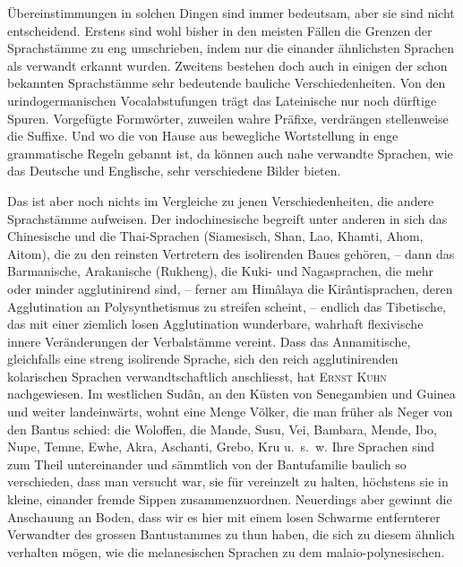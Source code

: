 Übereinstimmungen in solchen Dingen sind immer bedeutsam, aber sie sind nicht entscheidend. Erstens sind wohl bisher in den meisten Fällen die Grenzen der Sprachstämme zu eng umschrieben, indem nur die einander ähnlichsten Sprachen als verwandt erkannt wurden. Zweitens bestehen doch auch in einigen der schon bekannten Sprachstämme sehr bedeutende bauliche Verschiedenheiten. Von den urindogermanischen Vocalabstufungen trägt das Lateinische nur noch dürftige Spuren. Vorgefügte Formwörter, zuweilen wahre Präfixe, verdrängen stellenweise die Suffixe. Und wo die von Hause aus bewegliche Wortstellung in enge grammatische Regeln gebannt ist, da können auch nahe verwandte Sprachen, wie das Deutsche und Englische, sehr verschiedene Bilder bieten.

Das ist aber noch nichts im Vergleiche zu jenen Verschiedenheiten, die andere Sprachstämme aufweisen. Der indochinesische begreift unter anderen in sich das Chinesische und die Thai-Sprachen (Siamesisch, Shan, Lao, Khamti, Ahom, Aitom), die zu den reinsten Vertretern des isolirenden Baues gehören, – dann das Barmanische, Arakanische (Rukheng), die Kuki- und Nagasprachen, die mehr oder minder agglutinirend sind, – ferner am Himâlaya die Kirânti\label{sp.150}sprachen, deren Agglutination an Polysynthetismus zu streifen scheint, – endlich das Tibetische, das mit einer ziemlich losen Agglutination wunderbare, wahrhaft flexivische innere Veränderungen der Verbalstämme vereint. Dass das Annamitische, gleichfalls eine streng isolirende Sprache, sich den reich agglutinirenden kolarischen Sprachen verwandtschaftlich anschliesst, hat \textsc{Ernst Kuhn} nachgewiesen. Im westlichen Sudân, an den Küsten von Senegambien und Guinea und weiter landeinwärts, wohnt eine Menge Völker, die man früher als  Neger von den Bantus schied: die Woloffen, die Mande, Susu, Vei, Bambara, Mende, Ibo, Nupe, Temne, Ewhe, Akra, Aschanti, Grebo, Kru u.~s.~w. Ihre Sprachen sind zum Theil untereinander und sämmtlich von der Bantufamilie baulich so verschieden, dass man versucht war, sie für vereinzelt zu halten, höchstens sie in kleine, einander fremde Sippen zusammenzuordnen. Neuerdings aber gewinnt die Anschauung an Boden, dass wir es hier mit einem losen \label{fp.160} Schwarme entfernterer Verwandter des grossen Bantustammes zu thun haben, die sich zu diesem ähnlich verhalten mögen, wie die melanesischen Sprachen zu dem malaio-polynesischen.

